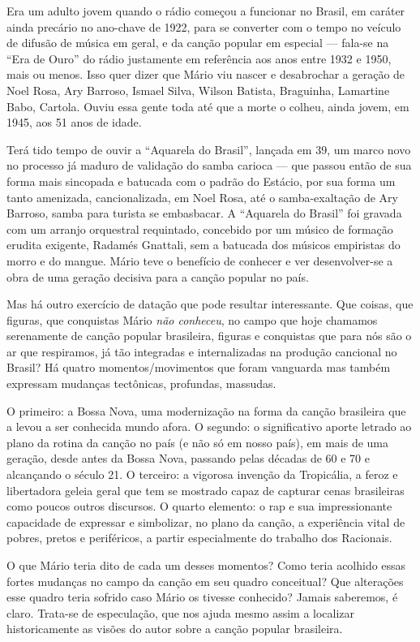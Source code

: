 Era um adulto jovem quando o rádio começou a funcionar no Brasil, em
caráter ainda precário no ano-chave de 1922, para se converter com o
tempo no veículo de difusão de música em geral, e da canção popular em
especial --- fala-se na ``Era de Ouro'' do rádio justamente em referência
aos anos entre 1932 e 1950, mais ou menos. Isso quer dizer que Mário viu
nascer e desabrochar a geração de Noel Rosa, Ary Barroso, Ismael Silva,
Wilson Batista, Braguinha, Lamartine Babo, Cartola. Ouviu essa gente
toda até que a morte o colheu, ainda jovem, em 1945, aos 51 anos de
idade.

Terá tido tempo de ouvir a ``Aquarela do Brasil'', lançada em 39, um
marco novo no processo já maduro de validação do samba carioca --- que
passou então de sua forma mais sincopada e batucada com o padrão do
Estácio, por sua forma um tanto amenizada, cancionalizada, em Noel Rosa,
até o samba-exaltação de Ary Barroso, samba para turista se embasbacar.
A ``Aquarela do Brasil'' foi gravada com um arranjo orquestral
requintado, concebido por um músico de formação erudita exigente,
Radamés Gnattali, sem a batucada dos músicos empiristas do morro e do
mangue. Mário teve o benefício de conhecer e ver desenvolver-se a obra
de uma geração decisiva para a canção popular no país.

Mas há outro exercício de datação que pode resultar interessante. Que
coisas, que figuras, que conquistas Mário \emph{não conheceu}, no campo
que hoje chamamos serenamente de canção popular brasileira, figuras e
conquistas que para nós são o ar que respiramos, já tão integradas e
internalizadas na produção cancional no Brasil? Há quatro
momentos/movimentos que foram vanguarda mas também expressam mudanças
tectônicas, profundas, massudas.

O primeiro: a Bossa Nova, uma modernização na forma da canção brasileira
que a levou a ser conhecida mundo afora. O segundo: o significativo
aporte letrado ao plano da rotina da canção no país (e não só em nosso
país), em mais de uma geração, desde antes da Bossa Nova, passando pelas
décadas de 60 e 70 e alcançando o século 21. O terceiro: a vigorosa
invenção da Tropicália, a feroz e libertadora geleia geral que tem se
mostrado capaz de capturar cenas brasileiras como poucos outros
discursos. O quarto elemento: o rap e sua impressionante capacidade de
expressar e simbolizar, no plano da canção, a experiência vital de
pobres, pretos e periféricos, a partir especialmente do trabalho dos
Racionais.

O que Mário teria dito de cada um desses momentos? Como teria acolhido
essas fortes mudanças no campo da canção em seu quadro conceitual? Que
alterações esse quadro teria sofrido caso Mário os tivesse conhecido?
Jamais saberemos, é claro. Trata-se de especulação, que nos ajuda mesmo
assim a localizar historicamente as visões do autor sobre a canção
popular brasileira.

